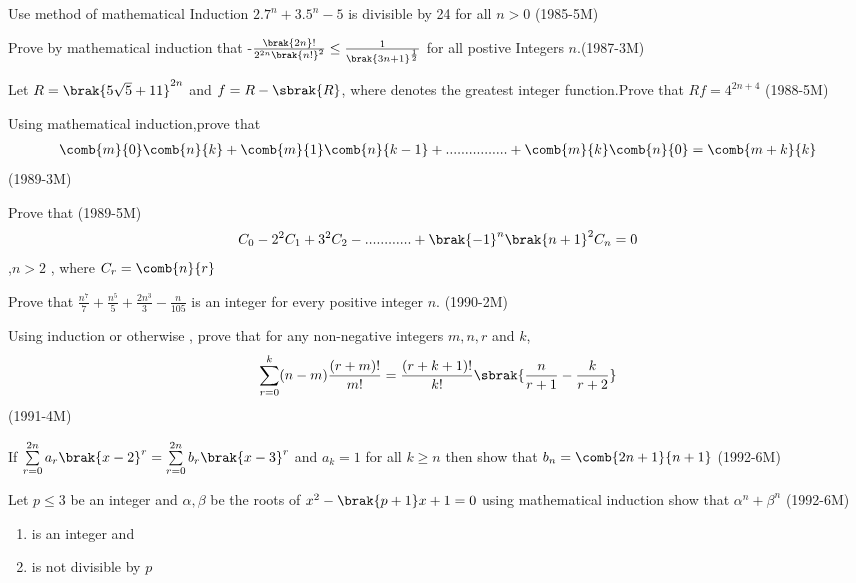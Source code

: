 	    \item Use method of mathematical Induction  $ 2.7^n +3.5^n-5 $ is divisible by 24 for all $ n>0 $ \hfill{(1985-5M)}


	    \item Prove by mathematical induction that -$\frac{\brak{2n}!}{2^{2n}\brak{n!}^2}\leq \frac{1}{\brak{3n+1}^{\frac{1}{2}}} $ for all postive Integers $n$.\hfill {(1987-3M)}


	    \item Let $ R =\brak{5\sqrt{5}+11}^{2n} $ and $ f = R -\sbrak{R} $, where \sbrak{} denotes the greatest integer function.Prove  that $ Rf =4^{2n+4 } $  \hfill {(1988-5M)}


	    \item Using mathematical induction,prove that
		    \begin{align*} \comb{m}{0}\comb{n}{k} +\comb{m}{1}\comb{n}{k-1}+................+\comb{m}{k}\comb{n}{0} =\comb{m+k}{k} \end{align*}  \hfill{(1989-3M)}


	    \item Prove that \hfill{(1989-5M)}
		    \begin{align*} 
		    C_0-2^2C_1+3^2C_2-............+\brak{-1}^n\brak{n+1}^2C_n =0
		    \end{align*},$n>2$ , where $C_r =\comb{n}{r}$
		    

	    \item Prove that   $ \frac{n^7}{7}+\frac{n^5}{5}+\frac{2n^3}{3}-\frac{n}{105}$ is an integer for every positive integer $ n$. \hfill{(1990-2M)}


	    \item Using induction or otherwise , prove that for any non-negative integers $m,n,r$ and $ k$,
		    \begin{align*} 
			    \sum_{r=0}^{k}(n-m)\frac{(r+m)!}{m!}= \frac{(r+k+1)!}{k!}\sbrak{\frac{n}{r+1}-\frac{k}{r+2}}
		    \end{align*}
		     \hfill{(1991-4M)} 

	     \item If $ \sum\limits_{r=0}^{2n} a_r \brak{x-2}^r=\sum\limits_{r=0}^{2n}b_r \brak{x-3}^r $ and $ a_k =1 $ for all $k \geq  n$ then show that $ b_n = \comb{2n+1}{n+1} $ \hfill{(1992-6M)}

	    \item Let $ p \leq 3 $ be an integer and $ \alpha , \beta $ be  the roots of $ x^2-\brak{p+1}x+1=0 $ using mathematical induction show that $ \alpha^n  + \beta^n $ \hfill{(1992-6M)}
		    \begin{enumerate}[label=(\roman*)]

			    \item is an integer and   
		    \item is not divisible by $ p $ \end{enumerate}
				    
		    
    
